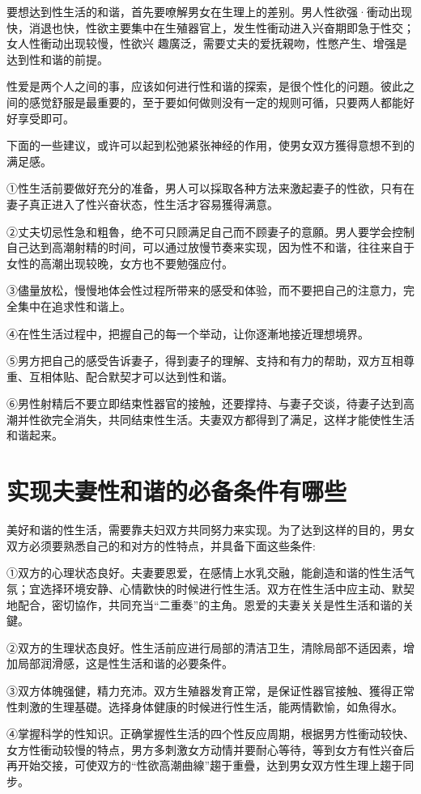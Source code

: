 \documentclass[12pt,UTF8]{ctexbook}
\begin{document}
要想达到性生活的和谐，首先要嘹解男女在生理上的差别。男人性欲强·衝动出现快，消退也快，性欲主要集中在生殖器官上，发生性衝动进入兴奋期即急于性交；女人性衝动出现较慢，性欲兴
趣廣泛，需要丈夫的爱抚親吻，性憋产生、增强是达到性和谐的前提。

性爱是两个人之间的事，应该如何进行性和谐的探索，是很个性化的问題。彼此之间的感觉舒服是最重要的，至于要如何做则没有一定的规则可循，只要两人都能好好享受即可。

下面的一些建议，或许可以起到松弛紧张神经的作用，使男女双方獲得意想不到的满足感。

①性生活前要做好充分的准备，男人可以採取各种方法来激起妻子的性欲，只有在妻子真正进入了性兴奋状态，性生活才容易獲得满意。

②丈夫切忌性急和粗魯，绝不可只顾满足自己而不顾妻子的意願。男人要学会控制自己达到高潮射精的时间，可以通过放慢节奏来实现，因为性不和谐，往往来自于女性的高潮出现较晚，女方也不要勉强应付。

③儘量放松，慢慢地体会性过程所带来的感受和体验，而不要把自己的注意力，完全集中在追求性和谐上。

④在性生活过程中，把握自己的每一个举动，让你逐漸地接近理想境界。

⑤男方把自己的感受告诉妻子，得到妻子的理解、支持和有力的帮助，双方互相尊重、互相体贴、配合默契才可以达到性和谐。

⑥男性射精后不要立即结束性器官的接触，还要撑持、与妻子交谈，待妻子达到高潮并性欲完全消失，共同结束性生活。夫妻双方都得到了满足，这样才能使性生活和谐起来。

\section{实现夫妻性和谐的必备条件有哪些}

美好和谐的性生活，需要靠夫妇双方共同努力来实现。为了达到这样的目的，男女双方必须要熟悉自己的和对方的性特点，并具备下面这些条件:

①双方的心理状态良好。夫妻要恩爱，在感情上水乳交融，能創造和谐的性生活气氛；宜选择环境安静、心情歡快的时候进行性生活。双方在性生活中应主动、默契地配合，密切協作，共同充当“二重奏”的主角。恩爱的夫妻关关是性生活和谐的关鍵。

②双方的生理状态良好。性生活前应进行局部的清洁卫生，清除局部不适因素，增加局部润滑感，这是性生活和谐的必要条件。

③双方体魄强健，精力充沛。双方生殖器发育正常，是保证性器官接触、獲得正常性刺激的生理基礎。选择身体健康的时候进行性生活，能两情歡愉，如魚得水。

④掌握科学的性知识。正确掌握性生活的四个性反应周期，根据男方性衝动较快、女方性衝动较慢的特点，男方多刺激女方动情并要耐心等待，等到女方有性兴奋后再开始交接，可使双方的“性欲高潮曲線”趨于重疊，达到男女双方性生理上趨于同步。
\end{document}
